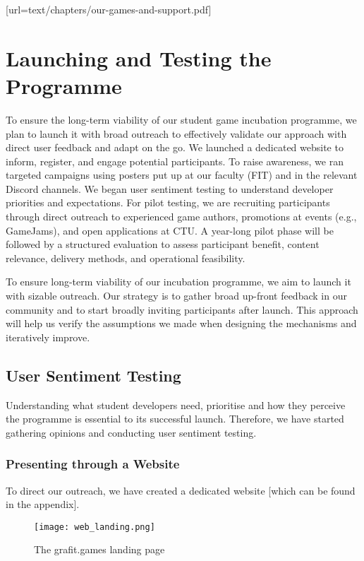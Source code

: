 [url=text/chapters/our-games-and-support.pdf]
\chapter{Launching and Testing the Programme}

\begin{chapterabstract}
	To ensure the long-term viability of our student game incubation programme, we plan to launch it with broad outreach to effectively validate our approach with direct user feedback and adapt on the go. We launched a dedicated website to inform, register, and engage potential participants. To raise awareness, we ran targeted campaigns using posters put up at our faculty (FIT) and in the relevant Discord channels. We began user sentiment testing to understand developer priorities and expectations. For pilot testing, we are recruiting participants through direct outreach to experienced game authors, promotions at events (e.g., GameJams), and open applications at CTU. A year-long pilot phase will be followed by a structured evaluation to assess participant benefit, content relevance, delivery methods, and operational feasibility.
\end{chapterabstract}

To ensure long-term viability of our incubation programme, we aim to launch it with sizable outreach. Our strategy is to gather broad up-front feedback in our community and to start broadly inviting participants after launch. This approach will help us verify the assumptions we made when designing the mechanisms and iteratively improve.

\section{User Sentiment Testing}
Understanding what student developers need, prioritise and how they perceive the programme is essential to its successful launch. Therefore, we have started gathering opinions and conducting user sentiment testing.

\subsection{Presenting through a Website}
To direct our outreach, we have created a dedicated website [which can be found in the appendix].
\begin{figure}[H]
    \texttt{[image: web\_landing.png]}
    \caption{The grafit.games landing page}
    \label{fig:web_landing}
\end{figure}


